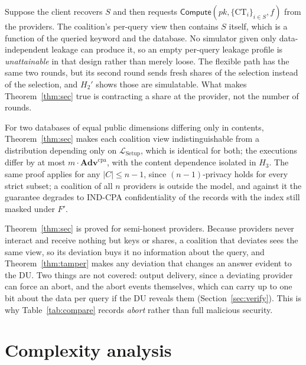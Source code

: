 \documentclass[a4paper,fleqn]{cas-sc}
\newcommand{\Leak}{\mathcal{L}}
\newcommand{\Compute}{\mathsf{Compute}}
\newcommand{\advCPA}{\mathbf{Adv}^{\mathrm{cpa}}}
\begin{document}
\begin{remark}
\label{rem:v1}
Suppose the client recovers $S$ and then requests
$\Compute(pk,\{\text{CT}_i\}_{i\in S},f)$ from the providers. The coalition's
per-query view then contains $S$ itself, which is a function of the queried
keyword and the database. No simulator given only data-independent leakage can
produce it, so an empty per-query leakage profile is \emph{unattainable} in
that design rather than merely loose. The flexible path has the same two
rounds, but its second round sends fresh shares of the selection instead of
the selection, and $H_2'$ shows those are simulatable. What makes
Theorem~\ref{thm:sec} true is contracting a share at the provider, not the
number of rounds.
\end{remark}

\begin{remark}
For two databases of equal public dimensions differing only in contents,
Theorem~\ref{thm:sec} makes each coalition view indistinguishable from a
distribution depending only on $\Leak_{\mathrm{Setup}}$, which is identical
for both; the executions differ by at most $m\cdot\advCPA$,
with the content dependence isolated in $H_3$. The same proof applies for any
$|C|\le n-1$, since $(n{-}1)$-privacy holds for every strict subset; a
coalition of all $n$ providers is outside the model, and against it the
guarantee degrades to IND-CPA confidentiality of the records with the index
still masked under $F'$.
\end{remark}

\begin{remark}
Theorem~\ref{thm:sec} is proved for semi-honest providers. Because providers
never interact and receive nothing but keys or shares, a coalition that
deviates sees the same view, so its deviation buys it no information about the
query, and Theorem~\ref{thm:tamper} makes any deviation that changes an answer
evident to the DU. Two things are not covered: output delivery, since a
deviating provider can force an abort, and the abort events themselves, which
can carry up to one bit about the data per query if the DU reveals them
(Section~\ref{sec:verify}). This is why Table~\ref{tab:compare} records
\emph{abort} rather than full malicious security.
\end{remark}

\section{Complexity analysis}
\label{sec:complexity}
\end{document}
